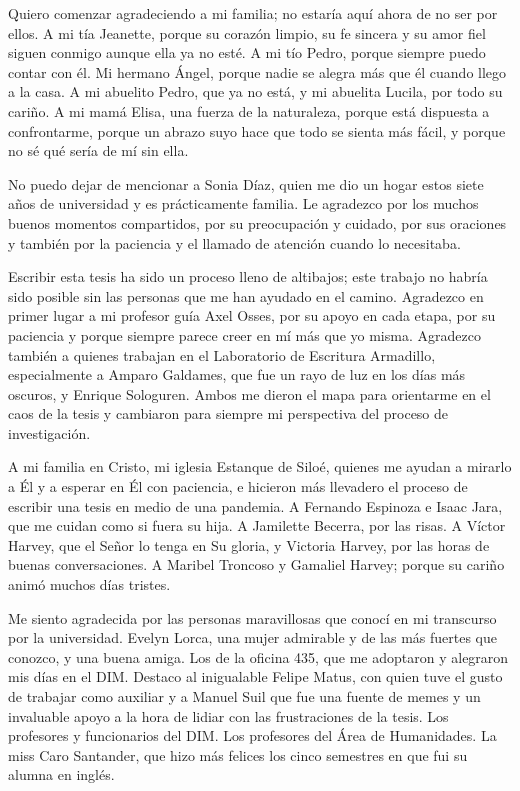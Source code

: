 \documentclass[upright, contnum]{umemoria}
\begin{document}
\begin{thanks}

Quiero comenzar agradeciendo a mi familia; no estaría aquí ahora de no ser por ellos. A mi tía Jeanette, porque su corazón limpio, su fe sincera y su amor fiel siguen conmigo aunque ella ya no esté. A mi tío Pedro, porque siempre puedo contar con él. Mi hermano Ángel, porque nadie se alegra más que él cuando llego a la casa. A mi abuelito Pedro, que ya no está, y mi abuelita Lucila, por todo su cariño. A mi mamá Elisa, una fuerza de la naturaleza, porque está dispuesta a confrontarme, porque un abrazo suyo hace que todo se sienta más fácil, y porque no sé qué sería de mí sin ella.

No puedo dejar de mencionar a Sonia Díaz, quien me dio un hogar estos siete años de universidad y es prácticamente familia. Le agradezco por los muchos buenos momentos compartidos, por su preocupación y cuidado, por sus oraciones y también por la paciencia y el llamado de atención cuando lo necesitaba. 

Escribir esta tesis ha sido un proceso lleno de altibajos; este trabajo no habría sido posible sin las personas que me han ayudado en el camino. Agradezco en primer lugar a mi profesor guía Axel Osses, por su apoyo en cada etapa, por su paciencia y porque siempre parece creer en mí más que yo misma. Agradezco también a quienes trabajan en el Laboratorio de Escritura Armadillo, especialmente a Amparo Galdames, que fue un rayo de luz en los días más oscuros, y Enrique Sologuren. Ambos me dieron el mapa para orientarme en el caos de la tesis y cambiaron para siempre mi perspectiva del proceso de investigación.

A mi familia en Cristo, mi iglesia Estanque de Siloé, quienes me ayudan a mirarlo a Él y a esperar en Él con paciencia, e hicieron más llevadero el proceso de escribir una tesis en medio de una pandemia. A Fernando Espinoza e Isaac Jara, que me cuidan como si fuera su hija. A Jamilette Becerra, por las risas. A Víctor Harvey, que el Señor lo tenga en Su gloria, y Victoria Harvey, por las horas de buenas conversaciones. A Maribel Troncoso y Gamaliel Harvey; porque su cariño animó muchos días tristes.

Me siento agradecida por las personas maravillosas que conocí en mi transcurso por la universidad. Evelyn Lorca, una mujer admirable y de las más fuertes que conozco, y una buena amiga. Los de la oficina 435, que me adoptaron y alegraron mis días en el DIM. Destaco al inigualable Felipe Matus, con quien tuve el gusto de trabajar como auxiliar y a Manuel Suil que fue una fuente de memes y un invaluable apoyo a la hora de lidiar con las frustraciones de la tesis. Los profesores y funcionarios del DIM. Los profesores del Área de Humanidades. La miss Caro Santander, que hizo más felices los cinco semestres en que fui su alumna en inglés. 


\end{thanks}
\end{document}
